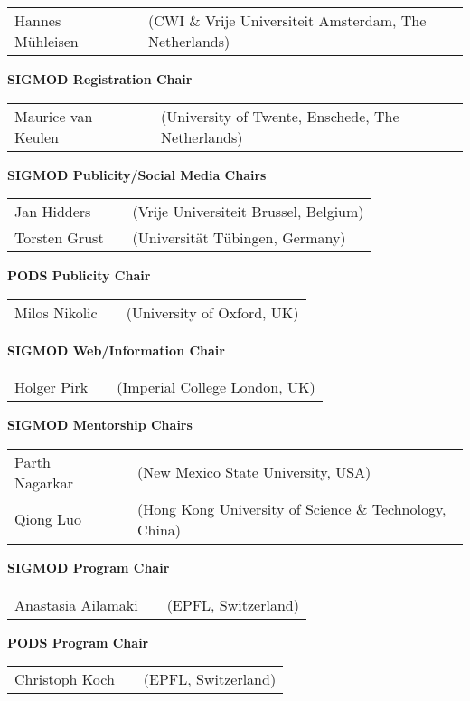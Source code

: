 {\begin{tabular}{lp{.5em}l}
Hannes Mühleisen	&& \textsf{\footnotesize(CWI \& Vrije Universiteit Amsterdam, The Netherlands)}
\end{tabular}

\vfill
\textbf{SIGMOD Registration Chair}

\begin{tabular}{lp{.5em}l}
Maurice van Keulen	&& \textsf{\footnotesize(University of Twente, Enschede, The Netherlands)}
\end{tabular}

\vfill
\textbf{SIGMOD Publicity/Social Media Chairs}

\begin{tabular}{lp{.5em}l}
Jan Hidders	&& \textsf{\footnotesize(Vrije Universiteit Brussel, Belgium)}	\\
Torsten Grust	&& \textsf{\footnotesize(Universität Tübingen, Germany)}
\end{tabular}

\vfill
\textbf{PODS Publicity Chair}

\begin{tabular}{lp{.5em}l}
Milos Nikolic	&& \textsf{\footnotesize(University of Oxford, UK)}
\end{tabular}

\vfill
\textbf{SIGMOD Web/Information Chair}

\begin{tabular}{lp{.5em}l}
Holger Pirk	&& \textsf{\footnotesize(Imperial College London, UK)}
\end{tabular}

\vfill
\textbf{SIGMOD Mentorship Chairs}

\begin{tabular}{lp{.5em}l}
Parth Nagarkar	&& \textsf{\footnotesize(New Mexico State University, USA)}	\\
Qiong Luo	&& \textsf{\footnotesize(Hong Kong University of Science \& Technology, China)}
\end{tabular}

\pagebreak

\textbf{SIGMOD Program Chair}

\begin{tabular}{lp{.5em}l}
Anastasia Ailamaki	&& \textsf{\footnotesize(EPFL, Switzerland)}
\end{tabular}

\vfill
\textbf{PODS Program Chair}

\begin{tabular}{lp{.5em}l}
Christoph Koch	&& \textsf{\footnotesize(EPFL, Switzerland)}
\end{tabular}

}
